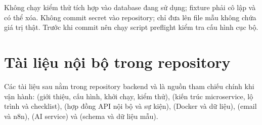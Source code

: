 \begin{warningbox}
Không chạy kiểm thử tích hợp vào database đang sử dụng; fixture phải cô lập và có thể xóa. Không commit secret vào repository; chỉ đưa lên file mẫu không chứa giá trị thật. Trước khi commit nên chạy script preflight kiểm tra cấu hình cục bộ.
\end{warningbox}

\section{Tài liệu nội bộ trong repository}
\label{sec:tai-lieu-noi-bo}

Các tài liệu sau nằm trong repository backend và là nguồn tham chiếu chính khi vận hành:  (giới thiệu, cấu hình, khởi chạy, kiểm thử),  (kiến trúc microservice, lộ trình và checklist),  (hợp đồng API nội bộ và sự kiện),  (Docker và dữ liệu),  (email và n8n),  (AI service) và  (schema và dữ liệu mẫu).